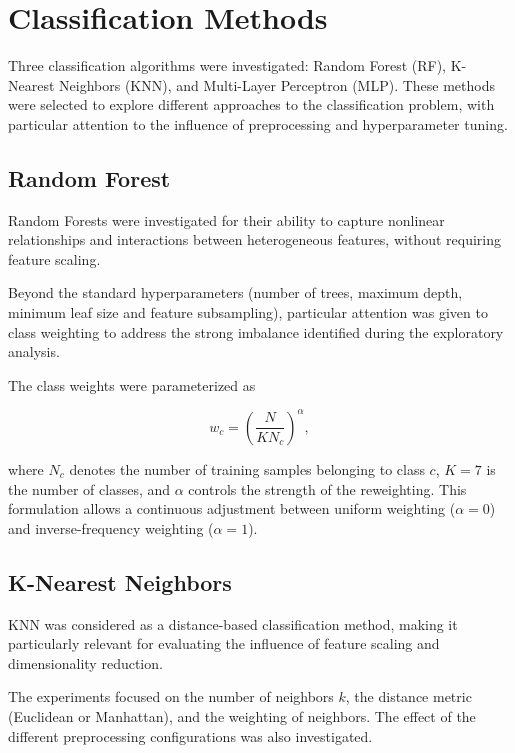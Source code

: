 \documentclass[10pt,a4paper]{article}
\begin{document}
\section{Classification Methods}

Three classification algorithms were investigated: Random Forest
(RF), K-Nearest Neighbors (KNN), and Multi-Layer Perceptron (MLP).
These methods were selected to explore different approaches to
the classification problem, with particular attention to the
influence of preprocessing and hyperparameter tuning.


\subsection{Random Forest}

Random Forests were investigated for their ability to capture
nonlinear relationships and interactions between heterogeneous
features, without requiring feature scaling.

Beyond the standard hyperparameters (number of trees, maximum
depth, minimum leaf size and feature subsampling), particular
attention was given to class weighting to address the strong
imbalance identified during the exploratory analysis.

The class weights were parameterized as

\begin{equation}
w_c = \left(\frac{N}{K N_c}\right)^\alpha,
\end{equation}

where $N_c$ denotes the number of training samples belonging
to class $c$, $K=7$ is the number of classes, and $\alpha$
controls the strength of the reweighting.
This formulation allows a continuous adjustment between
uniform weighting ($\alpha=0$) and inverse-frequency
weighting ($\alpha=1$).


\subsection{K-Nearest Neighbors}

KNN was considered as a distance-based classification method,
making it particularly relevant for evaluating the influence
of feature scaling and dimensionality reduction.

The experiments focused on the number of neighbors $k$,
the distance metric (Euclidean or Manhattan), and the
weighting of neighbors. The effect of the different
preprocessing configurations was also investigated.
\end{document}
